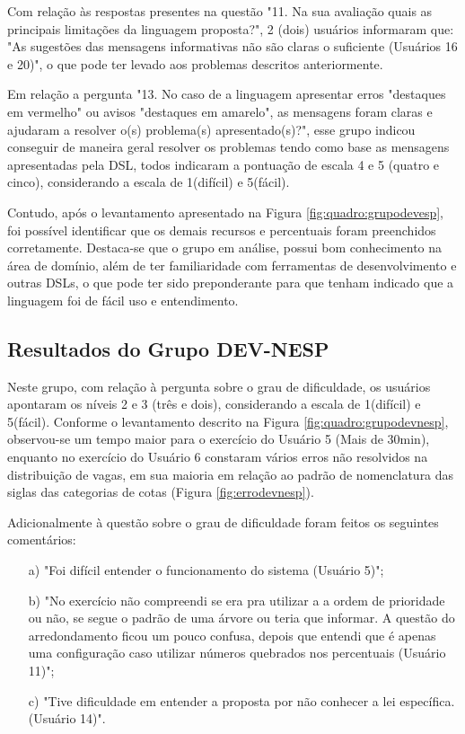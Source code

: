 Com relação às respostas presentes na questão "11. Na sua avaliação quais as principais limitações da linguagem proposta?", 2 (dois) usuários informaram que: "As sugestões das mensagens informativas não são claras o suficiente (Usuários 16 e 20)", o que pode ter levado aos problemas descritos anteriormente.

Em relação a pergunta "13. No caso de a linguagem apresentar erros "destaques em vermelho" ou avisos "destaques em amarelo", as mensagens foram claras e ajudaram a resolver o(s) problema(s) apresentado(s)?", esse grupo indicou conseguir de maneira geral resolver os problemas tendo como base as mensagens apresentadas pela DSL, todos indicaram a pontuação de escala 4 e 5 (quatro e cinco), considerando a escala de 1(difícil) e 5(fácil).

Contudo, após o levantamento apresentado na Figura \ref{fig:quadro:grupodevesp}, foi possível identificar que os demais recursos e percentuais foram preenchidos corretamente. Destaca-se que o grupo em análise, possui bom conhecimento na área de domínio, além de ter familiaridade com ferramentas de desenvolvimento e outras \gls{DSL}s, o que pode ter sido preponderante para que tenham indicado que a linguagem foi de fácil uso e entendimento. 


\subsection{Resultados do Grupo DEV-NESP}
\label{subsec:devnesp}

Neste grupo, com relação à pergunta sobre o grau de dificuldade, os usuários apontaram os níveis 2 e 3 (três e dois), considerando a escala de 1(difícil) e 5(fácil).  Conforme o levantamento descrito na Figura \ref{fig:quadro:grupodevnesp},  observou-se um tempo maior para o exercício do Usuário 5 (Mais de 30min), enquanto no exercício do Usuário 6 constaram vários erros não resolvidos na distribuição de vagas, em sua maioria em relação ao padrão de nomenclatura das siglas das categorias de cotas (Figura \ref{fig:errodevnesp}). 







Adicionalmente à questão sobre o grau de dificuldade foram feitos os seguintes comentários:

\begin{enumerate}
    \item [a)] "Foi difícil entender o funcionamento do sistema (Usuário 5)";
    \item [b)] "No exercício não compreendi se era pra utilizar a a ordem de prioridade ou não, se segue o padrão de uma árvore ou teria que informar. A questão do arredondamento ficou um pouco confusa, depois que entendi que é apenas uma configuração caso utilizar números quebrados nos percentuais (Usuário 11)";
    \item [c)] "Tive dificuldade em entender a proposta por não conhecer a lei específica.  (Usuário 14)".    
\end{enumerate}

